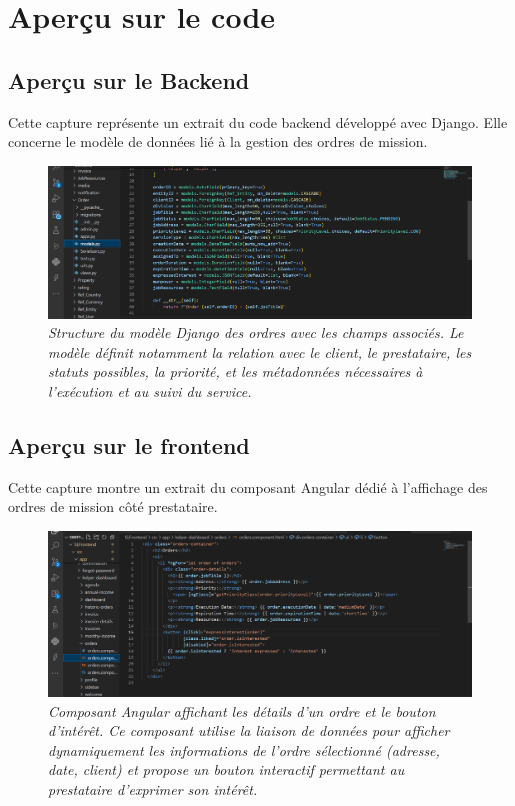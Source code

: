 \section*{Aperçu sur le code}
\subsection*{Aperçu sur le Backend}
\noindent
Cette capture représente un extrait du code backend développé avec Django. Elle concerne le modèle de données lié à la gestion des ordres de mission.

\begin{figure}[H]
\centering
\includegraphics[width=0.85\linewidth]{figures/appercue code backend.png}
\caption*{\textit{Structure du modèle Django des ordres avec les champs associés. Le modèle définit notamment la relation avec le client, le prestataire, les statuts possibles, la priorité, et les métadonnées nécessaires à l’exécution et au suivi du service.}}
\end{figure}

\subsection*{Aperçu sur le frontend}
\noindent
Cette capture montre un extrait du composant Angular dédié à l’affichage des ordres de mission côté prestataire.

\begin{figure}[H]
\centering
\includegraphics[width=0.85\linewidth]{figures/apercue code frontend.png}
\caption*{\textit{Composant Angular affichant les détails d'un ordre et le bouton d'intérêt. Ce composant utilise la liaison de données pour afficher dynamiquement les informations de l’ordre sélectionné (adresse, date, client) et propose un bouton interactif permettant au prestataire d’exprimer son intérêt.}}
\end{figure}
